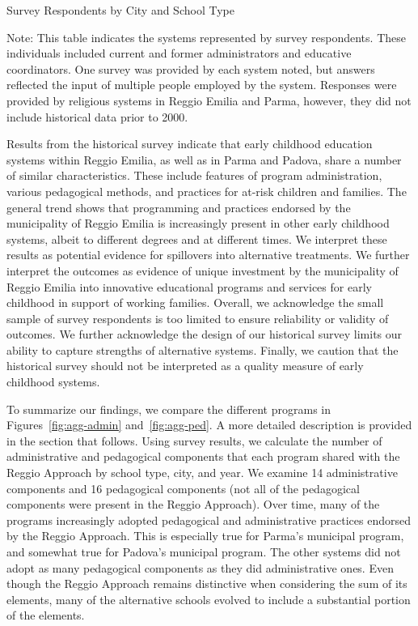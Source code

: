 \begin{table}[H]
\centering
\caption{Survey Respondents by City and School Type}\label{tab:respondents}
\begin{threeparttable}
	
\begin{tablenotes}
Note: This table indicates the systems represented by survey respondents. These individuals included current and former administrators and educative coordinators. One survey was provided by each system noted, but answers reflected the input of multiple people employed by the system. Responses were provided by religious systems in Reggio Emilia and Parma, however, they did not include historical data prior to 2000. 
\end{tablenotes}
\end{threeparttable}
\end{table}

Results from the historical survey indicate that early childhood education systems within Reggio Emilia, as well as in Parma and Padova, share a number of similar characteristics. These include features of program administration, various pedagogical methods, and practices for at-risk children and families. The general trend shows that programming and practices endorsed by the municipality of Reggio Emilia is increasingly present in other early childhood systems, albeit to different degrees and at different times. We interpret these results as potential evidence for spillovers into alternative treatments. We further interpret the outcomes as evidence of unique investment by the municipality of Reggio Emilia into innovative educational programs and services for early childhood in support of working families. Overall, we acknowledge the small sample of survey respondents is too limited to ensure reliability or validity of outcomes. We further acknowledge the design of our historical survey limits our ability to capture strengths of alternative systems. Finally, we caution that the historical survey should not be interpreted as a quality measure of early childhood systems.

To summarize our findings, we compare the different programs in Figures~\ref{fig:agg-admin} and~\ref{fig:agg-ped}. A more detailed description is provided in the section that follows. Using survey results, we calculate the number of administrative and pedagogical components that each program shared with the Reggio Approach by school type, city, and year. We examine 14 administrative components and 16 pedagogical components (not all of the pedagogical components were present in the Reggio Approach). Over time, many of the programs increasingly adopted pedagogical and administrative practices endorsed by the Reggio Approach. This is especially true for Parma's municipal program, and somewhat true for Padova's municipal program. The other systems did not adopt as many pedagogical components as they did administrative ones. Even though the Reggio Approach remains distinctive when considering the sum of its elements, many of the alternative schools evolved to include a substantial portion of the elements.

